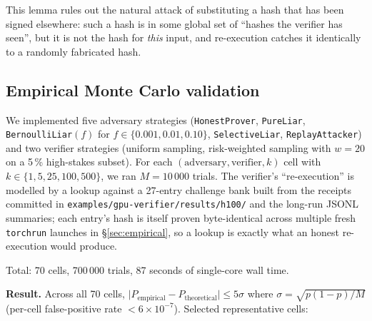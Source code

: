 \documentclass[10pt]{article}
\begin{document}
This lemma rules out the natural attack of substituting a hash that has been signed elsewhere: such a hash is in some global set of ``hashes the verifier has seen'', but it is not the hash for \emph{this} input, and re-execution catches it identically to a randomly fabricated hash.

\subsection{Empirical Monte Carlo validation}

We implemented five adversary strategies (\texttt{HonestProver}, \texttt{PureLiar}, \texttt{BernoulliLiar}$(f)$ for $f \in \{0.001, 0.01, 0.10\}$, \texttt{SelectiveLiar}, \texttt{ReplayAttacker}) and two verifier strategies (uniform sampling, risk-weighted sampling with $w=20$ on a 5\,\% high-stakes subset). For each $(\text{adversary}, \text{verifier}, k)$ cell with $k \in \{1, 5, 25, 100, 500\}$, we ran $M = 10\,000$ trials. The verifier's ``re-execution'' is modelled by a lookup against a 27-entry challenge bank built from the receipts committed in \texttt{examples/gpu-verifier/results/h100/} and the long-run JSONL summaries; each entry's hash is itself proven byte-identical across multiple fresh \texttt{torchrun} launches in \S\ref{sec:empirical}, so a lookup is exactly what an honest re-execution would produce.

Total: 70 cells, 700\,000 trials, 87 seconds of single-core wall time.

\textbf{Result.} Across all 70 cells, $\lvert P_{\text{empirical}} - P_{\text{theoretical}}\rvert \leq 5\sigma$ where $\sigma = \sqrt{p(1-p)/M}$ (per-cell false-positive rate $< 6 \times 10^{-7}$). Selected representative cells:
\end{document}
